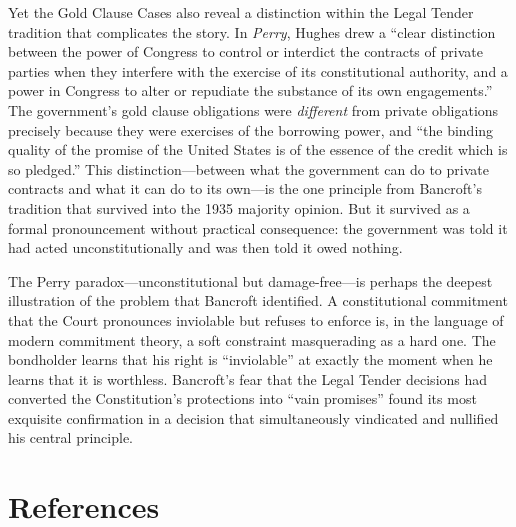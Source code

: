 \documentclass[12pt]{article}
\begin{document}
Yet the Gold Clause Cases also reveal a distinction within the Legal
Tender tradition that complicates the story. In \textit{Perry}, Hughes
drew a ``clear distinction between the power of Congress to control or
interdict the contracts of private parties when they interfere with the
exercise of its constitutional authority, and a power in Congress to
alter or repudiate the substance of its own engagements.'' The
government's gold clause obligations were \textit{different} from
private obligations precisely because they were exercises of the
borrowing power, and ``the binding quality of the promise of the United
States is of the essence of the credit which is so pledged.'' This
distinction---between what the government can do to private contracts
and what it can do to its own---is the one principle from Bancroft's
tradition that survived into the 1935 majority opinion. But it survived
as a formal pronouncement without practical consequence: the government
was told it had acted unconstitutionally and was then told it owed
nothing.

The Perry paradox---unconstitutional but damage-free---is perhaps the
deepest illustration of the problem that Bancroft identified. A
constitutional commitment that the Court pronounces inviolable but
refuses to enforce is, in the language of modern commitment theory, a
soft constraint masquerading as a hard one. The bondholder learns that
his right is ``inviolable'' at exactly the moment when he learns that
it is worthless. Bancroft's fear that the Legal Tender decisions had
converted the Constitution's protections into ``vain promises'' found
its most exquisite confirmation in a decision that simultaneously
vindicated and nullified his central principle.

\section*{References}
\end{document}
